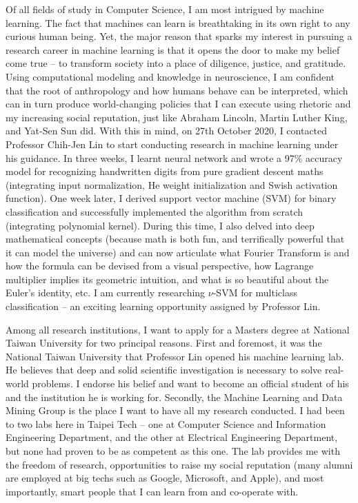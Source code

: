 \documentclass[letterpaper,12pt]{article}
\begin{document}
Of all fields of study in Computer Science, I am most intrigued by machine learning. The fact that machines can learn is breathtaking in its own right to any curious human being. Yet, the major reason that sparks my interest in pursuing a research career in machine learning is that it opens the door to make my belief come true -- to transform society into a place of diligence, justice, and gratitude. Using computational modeling and knowledge in neuroscience, I am confident that the root of anthropology and how humans behave can be interpreted, which can in turn produce world-changing policies that I can execute using rhetoric and my increasing social reputation, just like Abraham Lincoln, Martin Luther King, and Yat-Sen Sun did. With this in mind, on 27th October 2020, I contacted Professor Chih-Jen Lin to start conducting research in machine learning under his guidance. In three weeks, I learnt neural network and wrote a 97\% accuracy model for recognizing handwritten digits from pure gradient descent maths (integrating input normalization, He weight initialization and Swish activation function). One week later, I derived support vector machine (SVM) for binary classification and successfully implemented the algorithm from scratch (integrating polynomial kernel). During this time, I also delved into deep mathematical concepts (because math is both fun, and terrifically powerful that it can model the universe) and can now articulate what Fourier Transform is and how the formula can be devised from a visual perspective, how Lagrange multiplier implies its geometric intuition, and what is so beautiful about the Euler's identity, etc. I am currently researching \(\nu\)-SVM for multiclass classification -- an exciting learning opportunity assigned by Professor Lin.

Among all research institutions, I want to apply for a Masters degree at National Taiwan University for two principal reasons. First and foremost, it was the National Taiwan University that Professor Lin opened his machine learning lab. He believes that deep and solid scientific investigation is necessary to solve real-world problems. I endorse his belief and want to become an official student of his and the institution he is working for. Secondly, the Machine Learning and Data Mining Group is the place I want to have all my research conducted. I had been to two labs here in Taipei Tech -- one at Computer Science and Information Engineering Department, and the other at Electrical Engineering Department, but none had proven to be as competent as this one. The lab provides me with the freedom of research, opportunities to raise my social reputation (many alumni are employed at big techs such as Google, Microsoft, and Apple), and most importantly, smart people that I can learn from and co-operate with.
\end{document}
